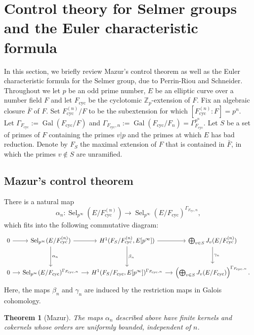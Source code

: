\documentclass[12pt]{amsart}
\newtheorem{theorem}{Theorem}[section]
\newcommand{\Z}{\mathbb{Z}}
\newcommand{\op}[1]{\operatorname{#1}}
\numberwithin{equation}{section}
\begin{document}
\section{Control theory for Selmer groups and the Euler characteristic formula}\label{s 3}

\par In this section, we briefly review Mazur's control theorem as well as the Euler characteristic formula for the Selmer group, due to Perrin-Riou and Schneider. Throughout we let $p$ be an odd prime number, $E$ be an elliptic curve over a number field $F$ and let $F_{\op{cyc}}$ be the cyclotomic $\Z_p$-extension of $F$. Fix an algebraic closure $\bar{F}$ of $F$. Set $F_{\op{cyc}}^{(n)}/F$ to be the subextension for which $[F_{\op{cyc}}^{(n)}:F]=p^n$. Let $\Gamma_{F_{\op{cyc}}}:=\op{Gal}(F_{\op{cyc}}/F)$ and $\Gamma_{F_{\op{cyc}}, n}:=\op{Gal}(F_{\op{cyc}}/F_n)=\Gamma_{F_{\op{cyc}}}^{p^n}$. Let $S$ be a set of primes of $F$ containing the primes $v|p$ and the primes at which $E$ has bad reduction. Denote by $F_S$ the maximal extension of $F$ that is contained in $\bar{F}$, in which the primes $v\notin S$ are unramified. 

\subsection{Mazur's control theorem}
There is a natural map
\[
\alpha_n: \op{Sel}_{p^\infty}(E/F_{\op{cyc}}^{(n)}) \longrightarrow \op{Sel}_{p^\infty}(E/F_{\op{cyc}})^{\Gamma_{F_{\op{cyc}}, n}},
\]
which fits into the following commutative diagram:
\[
\begin{tikzcd}[column sep = small, row sep = large]
0 \arrow{r} & \op{Sel}_{p^\infty}(E/F_{\op{cyc}}^{(n)}) \arrow{r} \arrow{d}{\alpha_n} & H^1(F_S/F_{\op{cyc}}^{(n)}, E[p^\infty]) \arrow{r} \arrow{d}{\beta_n} & \bigoplus_{v \in S} J_v(E/F_{\op{cyc}}^{(n)}) \arrow{d}{\gamma_n} \\
0 \arrow{r} & \op{Sel}_{p^\infty}(E/F_{\op{cyc}})^{\Gamma_{F_{\op{cyc}}, n}} \arrow{r} & H^1(F_S/F_{\op{cyc}}, E[p^\infty])^{\Gamma_{F_{\op{cyc}}, n}} \arrow{r} & \left(\bigoplus_{v \in S} J_v(E/F_{\op{cyc}})\right)^{\Gamma_{F_{\op{cyc}}, n}}.
\end{tikzcd}
\]
Here, the maps $\beta_n$ and $\gamma_n$ are induced by the restriction maps in Galois cohomology.

\begin{theorem}[Mazur]
    The maps $\alpha_n$ described above have finite kernels and cokernels whose orders are uniformly bounded, independent of $n$.
\end{theorem}
\end{document}

